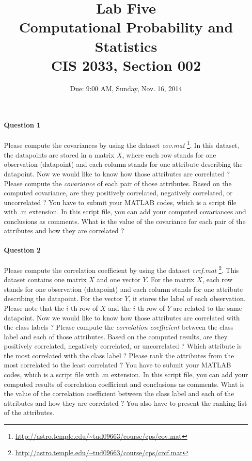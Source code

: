 \documentclass[11pt]{article} %
\title{Lab Five\\
Computational Probability and Statistics \\
CIS 2033, Section 002}
\author{Due: 9:00 AM, Sunday, Nov. 16, 2014}
\date{} %
\begin{document}
\maketitle

\paragraph*{Question 1}
Please compute the covariances by using the dataset {\it cov.mat} \footnote{\url{http://astro.temple.edu/~tud09663/course/cps/cov.mat}}. In this dataset, the datapoints are stored in a matrix $X$, where each row stands for one observation (datapoint) and each column stands for one attribute describing the datapoint. Now we would like to know how those attributes are correlated ? Please compute the {\it covariance} of each pair of those attributes. Based on the computed covariance, are they positively correlated, negatively correlated, or uncorrelated ? You have to submit your MATLAB codes, which is a script file with .m extension. In this script file, you can add your computed covariances and conclusions as comments. What is the value of the covariance for each pair of the attributes and how they are correlated ? 

\paragraph*{Question 2}
Please compute the correlation coefficient by using the dataset {\it crcf.mat} \footnote{\url{http://astro.temple.edu/~tud09663/course/cps/crcf.mat}}. This dataset contains one matrix $X$ and one vector $Y$. For the matrix $X$, each row stands for one observation (datapoint) and each column stands for one attribute describing the datapoint. For the vector $Y$, it stores the label of each observation. Please note that the $i$-th row of $X$ and the $i$-th row of $Y$ are related to the same datapoint. Now we would like to know how those attributes are correlated with the class labels ? Please compute the {\it correlation coefficient} between the class label and each of those attributes. Based on the computed results, are they positively correlated, negatively correlated, or uncorrelated ? Which attribute is the most correlated with the class label ? Please rank the attributes from the most correlated to the least correlated ? You have to submit your MATLAB codes, which is a script file with .m extension. In this script file, you can add your computed results of correlation coefficient and conclusions as comments. What is the value of the correlation coefficient between the class label and each of the attributes and how they are correlated ? You also have to present the ranking list of the attributes.  
\end{document}
